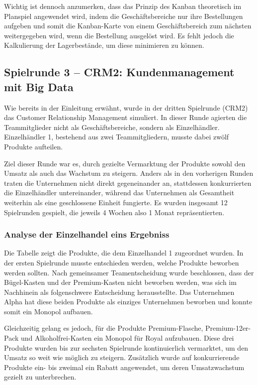 \documentclass[a4paper,12pt]{article}
\begin{document}
Wichtig ist dennoch anzumerken, dass das Prinzip des Kanban theoretisch im Planspiel angewendet wird,
indem die Geschäftsbereiche nur ihre Bestellungen aufgeben und somit die Kanban-Karte von 
einem Geschäftsbereich zum nächsten weitergegeben wird,
wenn die Bestellung ausgelöst wird. Es fehlt jedoch die Kalkulierung der Lagerbestände, um diese minimieren zu können.
\newpage
\subsection{Spielrunde 3 – CRM2: Kundenmanagement mit Big Data}
Wie bereits in der Einleitung erwähnt, wurde in der dritten Spielrunde (CRM2) das Customer Relationship Management simuliert.
In dieser Runde agierten die Teammitglieder nicht als Geschäftsbereiche, sondern als Einzelhändler. 
Einzelhändler 1, bestehend aus zwei Teammitgliedern, musste dabei zwölf Produkte aufteilen.

Ziel dieser Runde war es, durch gezielte Vermarktung der Produkte sowohl den Umsatz als auch das Wachstum zu steigern. 
Anders als in den vorherigen Runden traten die Unternehmen nicht direkt gegeneinander an,
stattdessen konkurrierten die Einzelhändler untereinander,
während das Unternehmen als Gesamtheit weiterhin als eine geschlossene Einheit fungierte.
Es wurden insgesamt 12 Spielrunden gespielt, die jeweils 4 Wochen also 1 Monat repräsentierten.
\subsubsection{Analyse der Einzelhandel eins Ergebniss}
Die Tabelle zeigt die Produkte, die dem Einzelhandel 1 zugeordnet wurden.
In der ersten Spielrunde musste entschieden werden, welche Produkte beworben werden sollten.
Nach gemeinsamer Teamentscheidung wurde beschlossen, dass der Bügel-Kasten und der Premium-Kasten nicht beworben werden,
was sich im Nachhinein als folgenschwere Entscheidung herausstellte.
Das Unternehmen Alpha hat diese beiden Produkte als einziges Unternehmen beworben und konnte somit ein Monopol aufbauen.

Gleichzeitig gelang es jedoch, für die Produkte Premium-Flasche,
Premium-12er-Pack und Alkoholfrei-Kasten ein Monopol für Royal aufzubauen.
Diese drei Produkte wurden bis zur sechsten Spielrunde kontinuierlich vermarktet,
um den Umsatz so weit wie möglich zu steigern.
Zusätzlich wurde auf konkurrierende Produkte ein- bis zweimal ein Rabatt angewendet,
um deren Umsatzwachstum gezielt zu unterbrechen.
\end{document}
